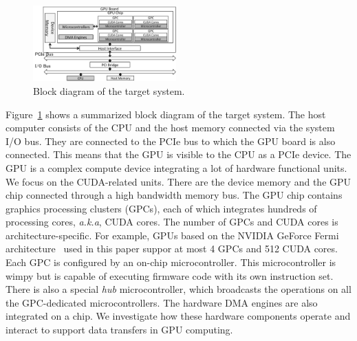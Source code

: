 \begin{figure}[!t]
 \centering
 \includegraphics[width=0.49\textwidth]{figure/Method/pci_gpu.pdf}
 \caption{Block diagram of the target system.}
 \label{fig:pci_gpu}
\end{figure}

Figure~\ref{fig:pci_gpu} shows a summarized block diagram of the target
system.
The host computer consists of the CPU and the host memory connected via
the system I/O bus.
They are connected to the PCIe bus to which the GPU board is also
connected.
This means that the GPU is visible to the CPU as a PCIe device.
The GPU is a complex compute device integrating a lot of hardware
functional units.
We focus on the CUDA-related units.
There are the device memory and the GPU chip connected through a high
bandwidth memory bus.
The GPU chip contains graphics processing clusters (GPCs), each of which
integrates hundreds of processing cores, \textit{a.k.a}, CUDA cores.
The number of GPCs and CUDA cores is architecture-specific.
For example, GPUs based on the NVIDIA GeForce Fermi
architecture~\cite{NVIDIA_Fermi} used in this paper suppor at most 4
GPCs and 512 CUDA cores.
Each GPC is configured by an on-chip microcontroller.
This microcontroller is wimpy but is capable of executing firmware code
with its own instruction set.
There is also a special \textit{hub} microcontroller, which broadcasts the
operations on all the GPC-dedicated microcontrollers.
The hardware DMA engines are also integrated on a chip.
We investigate how these hardware components operate and interact to
support data transfers in GPU computing.
